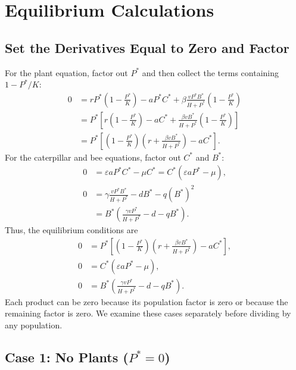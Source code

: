 \documentclass[11pt]{article}
\begin{document}
\clearpage
\section{Equilibrium Calculations}

\subsection{Set the Derivatives Equal to Zero and Factor}

For the plant equation, factor out $P^*$ and then collect the terms containing
$1-P^*/K$:
\begin{align*}
    0 &= rP^*\left(1-\frac{P^*}{K}\right)-aP^*C^*
    +\beta\frac{vP^*B^*}{H+P^*}\left(1-\frac{P^*}{K}\right) \\
      &= P^*\left[r\left(1-\frac{P^*}{K}\right)-aC^*
      +\frac{\beta vB^*}{H+P^*}\left(1-\frac{P^*}{K}\right)\right] \\
      &= P^*\left[\left(1-\frac{P^*}{K}\right)
      \left(r+\frac{\beta vB^*}{H+P^*}\right)-aC^*\right].
\end{align*}
For the caterpillar and bee equations, factor out $C^*$ and $B^*$:
\begin{align*}
    0 &= \varepsilon aP^*C^*-\mu C^*
       = C^*(\varepsilon aP^*-\mu), \\
    0 &= \gamma\frac{vP^*B^*}{H+P^*}-dB^*-q(B^*)^2 \\
      &= B^*\left(\frac{\gamma vP^*}{H+P^*}-d-qB^*\right).
\end{align*}
Thus, the equilibrium conditions are
\begin{align}
    0 &= P^*\left[\left(1-\frac{P^*}{K}\right)
    \left(r+\frac{\beta vB^*}{H+P^*}\right)-aC^*\right],
    \label{eq:plant-equilibrium} \\
    0 &= C^*(\varepsilon aP^*-\mu),
    \label{eq:caterpillar-equilibrium} \\
    0 &= B^*\left(\frac{\gamma vP^*}{H+P^*}-d-qB^*\right).
    \label{eq:bee-equilibrium}
\end{align}
Each product can be zero because its population factor is zero or because
the remaining factor is zero. We examine these cases separately before
dividing by any population.

\subsection{Case 1: No Plants ($P^*=0$)}
\end{document}
